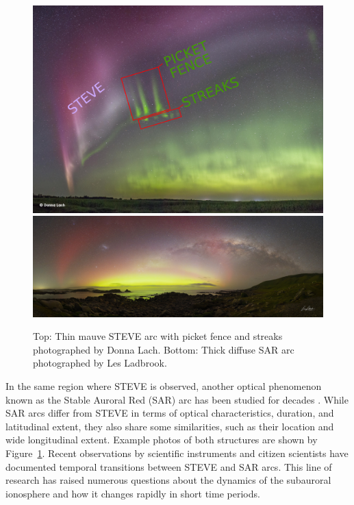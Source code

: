 \documentclass{article}
\renewcommand{\cite}[1]{\parencite{#1}}
\begin{document}
\begin{figure}[h!]
  \includegraphics[width=\linewidth]{Fig6a_STEVE-DonnaLach.png}
\includegraphics[width=\linewidth]{Fig6b_SAR-LesLadbrook.jpg}
  \caption{Top: Thin mauve STEVE arc with picket fence and streaks photographed by Donna Lach. Bottom: Thick diffuse SAR arc photographed by Les Ladbrook.}
  \label{STEVESARExample}
\end{figure}
In the same region where STEVE is observed, another optical phenomenon known as the Stable Auroral Red (SAR) arc has been studied for decades \cite{Kozyra1997, Mendillo_2016a, Martinis2022}. While SAR arcs differ from STEVE in terms of optical characteristics, duration, and latitudinal extent, they also share some similarities, such as their location and wide longitudinal extent. Example photos of both structures are shown by Figure~\ref{STEVESARExample}. Recent observations by scientific instruments and citizen scientists have documented temporal transitions between STEVE and SAR arcs. This line of research has raised numerous questions about the dynamics of the subauroral ionosphere and how it changes rapidly in short time periods.\\
\end{document}
